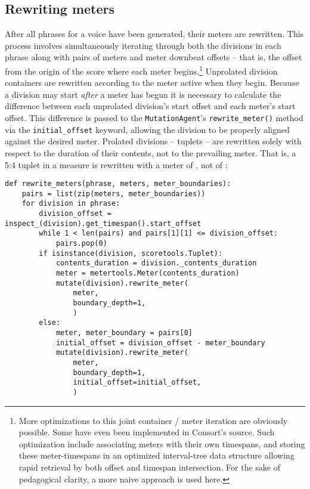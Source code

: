 \subsection{Rewriting meters}
\label{ssec:rewriting-meters}

After all phrases for a voice have been generated, their meters are rewritten.
This process involves simultaneously iterating through both the divisions in
each phrase along with pairs of meters and meter downbeat offsets -- that is,
the offset from the origin of the score where each meter begins.\footnote{More
optimizations to this joint container / meter iteration are obviously possible.
Some have even been implemented in Consort's source. Such optimization include
associating meters with their own timespans, and storing these meter-timespans
in an optimized interval-tree data structure allowing rapid retrieval by both
offset and timespan intersection. For the sake of pedagogical clarity, a more
naive approach is used here.} Unprolated division containers are rewritten
according to the meter active when they begin. Because a division may start
\emph{after} a meter has begun it is necessary to calculate the difference
between each unprolated division's start offset and each meter's start offset.
This difference is passed to the \texttt{MutationAgent}'s
\texttt{rewrite\_meter()} method via the \texttt{initial\_offset} keyword,
allowing the division to be properly aligned against the desired meter.
Prolated divisions -- tuplets -- are rewritten solely with respect to the
duration of their contents, not to the prevailing meter. That is, a 5:4 tuplet
in a  measure is rewritten with a meter of , not of
:

\begin{comment}
<abjadextract dissertation.py.time_tools:rewrite_meters />[strip_prompt]
\end{comment}

\begin{abjadbookoutput}
\begin{singlespacing}
\vspace{-0.5\baselineskip}
\begin{verbatim}
def rewrite_meters(phrase, meters, meter_boundaries):
    pairs = list(zip(meters, meter_boundaries))
    for division in phrase:
        division_offset = inspect_(division).get_timespan().start_offset
        while 1 < len(pairs) and pairs[1][1] <= division_offset:
            pairs.pop(0)
        if isinstance(division, scoretools.Tuplet):
            contents_duration = division._contents_duration
            meter = metertools.Meter(contents_duration)
            mutate(division).rewrite_meter(
                meter,
                boundary_depth=1,
                )
        else:
            meter, meter_boundary = pairs[0]
            initial_offset = division_offset - meter_boundary
            mutate(division).rewrite_meter(
                meter,
                boundary_depth=1,
                initial_offset=initial_offset,
                )
\end{verbatim}
\end{singlespacing}
\end{abjadbookoutput}

